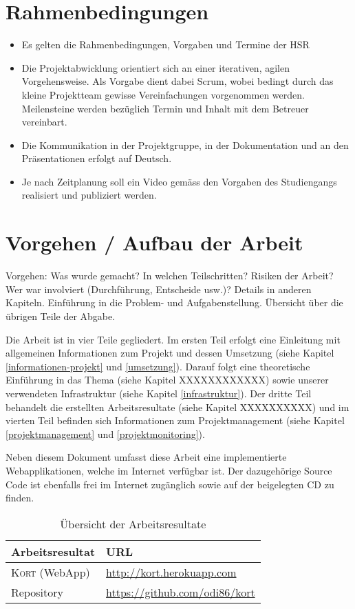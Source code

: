 \section{Rahmenbedingungen}
\begin{itemize}
\item Es gelten die Rahmenbedingungen, Vorgaben und Termine der HSR
\item Die Projektabwicklung orientiert sich an einer iterativen, agilen Vorgehensweise. Als Vorgabe dient dabei Scrum, wobei bedingt durch das kleine Projektteam gewisse Vereinfachungen vorgenommen werden. Meilensteine werden bezüglich Termin und Inhalt mit dem Betreuer vereinbart.
\item Die Kommunikation in der Projektgruppe, in der Dokumentation und an den Präsentationen erfolgt auf Deutsch.
\item Je nach Zeitplanung soll ein Video gemäss den Vorgaben des Studiengangs realisiert und publiziert werden.
\end{itemize}

\section{Vorgehen / Aufbau der Arbeit}
Vorgehen: Was wurde gemacht? In welchen Teilschritten? Risiken der Arbeit? Wer war involviert (Durchführung, Entscheide usw.)? Details in anderen Kapiteln.
Einführung in die Problem- und Aufgabenstellung. Übersicht über die übrigen Teile der Abgabe. 


Die Arbeit ist in vier Teile gegliedert. Im ersten Teil erfolgt eine Einleitung mit allgemeinen Informationen zum Projekt und dessen Umsetzung (siehe Kapitel \ref{informationen-projekt} und \ref{umsetzung}). Darauf folgt eine theoretische Einführung in das Thema (siehe Kapitel XXXXXXXXXXXX) sowie unserer verwendeten Infrastruktur (siehe Kapitel \ref{infrastruktur}). Der dritte Teil behandelt die erstellten Arbeitsresultate (siehe Kapitel XXXXXXXXXX) und im vierten Teil befinden sich Informationen zum Projektmanagement (siehe Kapitel \ref{projektmanagement} und \ref{projektmonitoring}).

Neben diesem Dokument umfasst diese Arbeit eine implementierte Webapplikationen, welche im Internet verfügbar ist. Der dazugehörige Source Code ist ebenfalls frei im Internet zugänglich sowie auf der beigelegten CD zu finden.

\begin{table}[H]
\centering
\begin{tabular}{|p{0.3\twocelltabwidth}|p{0.7\twocelltabwidth}|}
\hline 
\textbf{Arbeitsresultat} & \textbf{URL} \\ 
\hline 
\textsc{Kort} (WebApp) & \url{http://kort.herokuapp.com} \\ 
\hline 
Repository & \url{https://github.com/odi86/kort} \\ 
\hline 
\end{tabular}
\label{arbeitsresultate}
\caption{Übersicht der Arbeitsresultate}
\end{table} 
